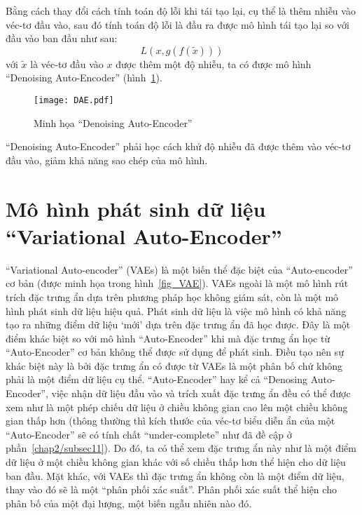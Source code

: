     Bằng cách thay đổi cách tính toán độ lỗi khi tái tạo lại, cụ thể là thêm nhiễu vào véc-tơ đầu vào, 
    sau đó tính toán độ lỗi là đầu ra được mô hình tái tạo lại so với đầu vào ban đầu như sau:
    \begin{equation}
        L(x, g(f(\tilde{x})))
    \end{equation}
    với 
    \begin{math} \tilde{x} \end{math}
    là véc-tơ đầu vào 
    \begin{math}
        x
    \end{math} 
    được thêm một độ nhiễu, ta có được mô hình ``Denoising Auto-Encoder'' (hình~\ref{fig_DAE}). 
    \begin{figure}
        \centering
        \texttt{[image: DAE.pdf]}
        \caption{Minh họa ``Denoising Auto-Encoder''}
        \label{fig_DAE}
    \end{figure}
    
    ``Denoising Auto-Encoder'' phải học cách khử độ nhiễu đã được thêm vào véc-tơ đầu vào,
    giảm khả năng sao chép của mô hình.






\section{Mô hình phát sinh dữ liệu ``Variational Auto-Encoder''} \label{chap2/sec2}
        ``Variational Auto-encoder'' (VAEs) là một biến thể đặc biệt của ``Auto-encoder'' cơ bản (được minh họa trong hình~\ref{fig_VAE}). 
        VAEs ngoài là một mô hình rút trích đặc trưng ẩn dựa trên phương pháp học không giám sát, còn là một mô hình phát sinh dữ liệu hiệu quả. 
        Phát sinh dữ liệu là việc mô hình có khả năng tạo ra những điểm dữ liệu `mới' dựa trên đặc trưng ẩn đã học được.
        Đây là một điểm khác biệt so với mô hình ``Auto-Encoder'' khi mà đặc trưng ẩn học từ ``Auto-Encoder'' cơ bản không thể được sử dụng để phát sinh. 
        Điều tạo nên sự khác biệt này là bởi đặc trưng ẩn có được từ VAEs là một phân bố chứ không phải là một điểm dữ liệu cụ thể. 
        ``Auto-Encoder'' hay kể cả ``Denosing Auto-Encoder'', việc nhận dữ liệu đầu vào và trích xuất đặc trưng ẩn đều có thể được xem như là một phép chiếu dữ liệu ở chiều không gian cao lên một chiều không gian thấp hơn (thông thường thì kích thước của véc-tơ biểu diễn ẩn của một ``Auto-Encoder'' sẽ có tính chất ``under-complete'' như đã đề cập ở phần~\ref{chap2/subsec11}). 
        Do đó, ta có thể xem đặc trưng ẩn này như là một điểm dữ liệu ở một chiều không gian khác với số chiều thấp hơn thể hiện cho dữ liệu ban đầu. 
        Mặt khác, với VAEs thì đặc trưng ẩn không còn là một điểm dữ liệu, thay vào đó sẽ là một ``phân phối xác suất''. 
        Phân phối xác suất thể hiện cho phân bố của một đại lượng, một biến ngẫu nhiên nào đó.
    

